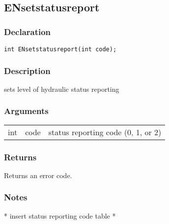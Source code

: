 \subsection{ENsetstatusreport}
\subsubsection{Declaration}
\begin{lstlisting}
int ENsetstatusreport(int code);
\end{lstlisting}
\subsubsection{Description}
sets level of hydraulic status reporting
\subsubsection{Arguments}
\begin{tabular}{l r p{11cm} }
int&code&status reporting code (0, 1, or 2)\\[6pt]
\end{tabular}
\subsubsection{Returns}
Returns an error code.
\subsubsection{Notes}
* insert status reporting code table *